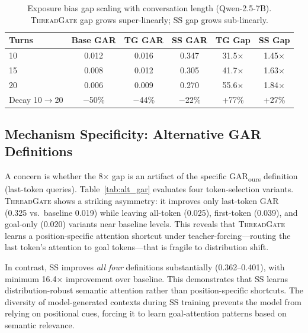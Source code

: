 \documentclass[11pt]{article}
\newcommand{\gar}{\textsc{GAR}}
\newcommand{\garours}{\textsc{GAR}\textsubscript{ours}}
\newcommand{\tg}{\textsc{ThreadGate}}
\begin{document}
\begin{table}[t]
\centering
\small
\caption{Exposure bias gap scaling with conversation length (Qwen-2.5-7B). \tg{} gap grows super-linearly; SS gap grows sub-linearly.}
\label{tab:long_conv}
\begin{tabular}{lccccc}
\toprule
\textbf{Turns} & \textbf{Base \gar{}} & \textbf{TG \gar{}} & \textbf{SS \gar{}} & \textbf{TG Gap} & \textbf{SS Gap} \\
\midrule
10 & 0.012 & 0.016 & 0.347 & 31.5$\times$ & 1.45$\times$ \\
15 & 0.008 & 0.012 & 0.305 & 41.7$\times$ & 1.63$\times$ \\
20 & 0.006 & 0.009 & 0.270 & 55.6$\times$ & 1.84$\times$ \\
\midrule
Decay 10$\to$20 & $-$50\% & $-$44\% & $-$22\% & +77\% & +27\% \\
\bottomrule
\end{tabular}
\end{table}

\subsection{Mechanism Specificity: Alternative GAR Definitions}

A concern is whether the 8$\times$ gap is an artifact of the specific \garours{} definition (last-token queries). Table~\ref{tab:alt_gar} evaluates four token-selection variants. \tg{} shows a striking asymmetry: it improves only last-token \gar{} (0.325 vs.\ baseline 0.019) while leaving all-token (0.025), first-token (0.039), and goal-only (0.020) variants near baseline levels. This reveals that \tg{} learns a position-specific attention shortcut under teacher-forcing---routing the last token's attention to goal tokens---that is fragile to distribution shift.

In contrast, SS improves \emph{all four} definitions substantially (0.362--0.401), with minimum 16.4$\times$ improvement over baseline. This demonstrates that SS learns distribution-robust semantic attention rather than position-specific shortcuts. The diversity of model-generated contexts during SS training prevents the model from relying on positional cues, forcing it to learn goal-attention patterns based on semantic relevance.
\end{document}
